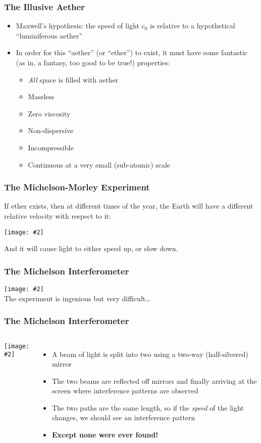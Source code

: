 \documentclass[12pt,compress,aspectratio=169]{beamer}
\newcommand{\pic}[2]{\texttt{[image: \#2]}}
\begin{document}
\begin{frame}
  \frametitle{The Illusive Aether}
  \begin{itemize}
  \item Maxwell's hypothesis: the speed of light $c_0$ is relative to a
    hypothetical ``luminiferous aether''
  \item In order for this ``aether'' (or ``ether'') to exist, it must have some
    fantastic (as in, a fantasy, too good to be true!) properties:
    \begin{itemize}
    \item \emph{All} space is filled with aether
    \item Massless
    \item Zero viscosity
    \item Non-dispersive
    \item Incompressible
    \item Continuous at a very small (sub-atomic) scale
    \end{itemize}
  \end{itemize}
\end{frame}

\begin{frame}
  \frametitle{The Michelson-Morley Experiment}
  If ether exists, then at different times of the year, the Earth will have a
  different relative velocity with respect to it:
  \begin{center}
    \pic{.45}{graphics/2000px-AetherWind.png}
  \end{center}
  And it will cause light to either speed up, or slow down.
\end{frame}

\begin{frame}
  \frametitle{The Michelson Interferometer}
  \pic{1}{graphics/michelsonmorley.jpg}\\
  The experiment is ingenious but very difficult\ldots
\end{frame}

\begin{frame}
  \frametitle{The Michelson Interferometer}
  \begin{columns}
    \begin{center}
      \pic{1.1}{graphics/313754.jpg}
    \end{center}

    \begin{itemize}
    \item A beam of light is split into two using a two-way (half-silvered)
      mirror
    \item The two beams are reflected off mirrors and finally arriving at the
      screen where interference patterns are observed
    \item The two paths are the same length, so if the \emph{speed} of the light
      changes, we should see an interference pattern
    \item\textbf{Except none were ever found!}
    \end{itemize}
  \end{columns}
\end{frame}
\end{document}
